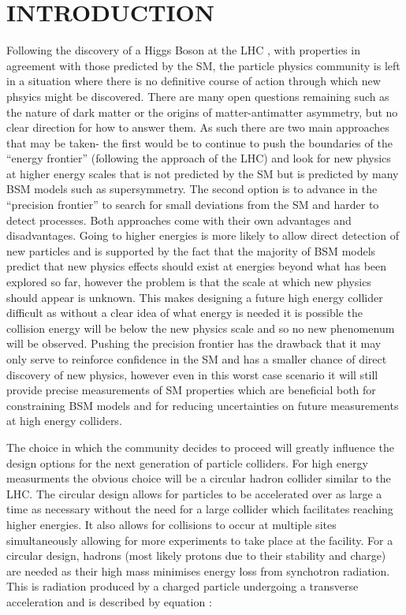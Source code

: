 \chapter{INTRODUCTION}

Following the discovery of a Higgs Boson at the \ac{LHC} \cite{:2012gk,Chatrchyan:2012xdj}, with properties in agreement with those predicted by the \ac{SM}, the particle physics community is left in a situation where there is no definitive course of action through which new phsyics might be discovered. There are many open questions remaining such as the nature of dark matter or the origins of matter-antimatter asymmetry, but no clear direction for how to answer them. As such there are two main approaches that may be taken- the first would be to continue to push the boundaries of the ``energy frontier'' (following the approach of the \ac{LHC}) and look for new physics at higher energy scales that is not predicted by the \ac{SM} but is predicted by many \ac{BSM} models such as supersymmetry. The second option is to advance in the ``precision frontier'' to search for small deviations from the \ac{SM} and harder to detect processes. Both approaches come with their own advantages and disadvantages. Going to higher energies is more likely to allow direct detection of new particles and is supported by the fact that the majority of \ac{BSM} models predict that new physics effects should exist at energies beyond what has been explored so far, however the problem is that the scale at which new physics should appear is unknown. This makes designing a future high energy collider difficult as without a clear idea of what energy is needed it is possible the collision energy will be below the new physics scale and so no new phenomenum will be observed. Pushing the precision frontier has the drawback that it may only serve to reinforce confidence in the \ac{SM} and has a smaller chance of direct discovery of new physics, however even in this worst case scenario it will still provide precise measurements of \ac{SM} properties which are beneficial both for constraining \ac{BSM} models and for reducing uncertainties on future measurements at high energy colliders.

The choice in which the community decides to proceed will greatly influence the design options for the next generation of particle colliders. For high energy measurments the obvious choice will be a circular hadron collider similar to the \ac{LHC}. The circular design allows for particles to be accelerated over as large a time as necessary without the need for a large collider which facilitates reaching higher energies. It also allows for collisions to occur at multiple sites simultaneously allowing for more experiments to take place at the facility. For a circular design, hadrons (most likely protons due to their stability and charge) are needed as their high mass minimises energy loss from synchotron radiation. This is radiation produced by a charged particle undergoing a transverse acceleration and is described by equation :

